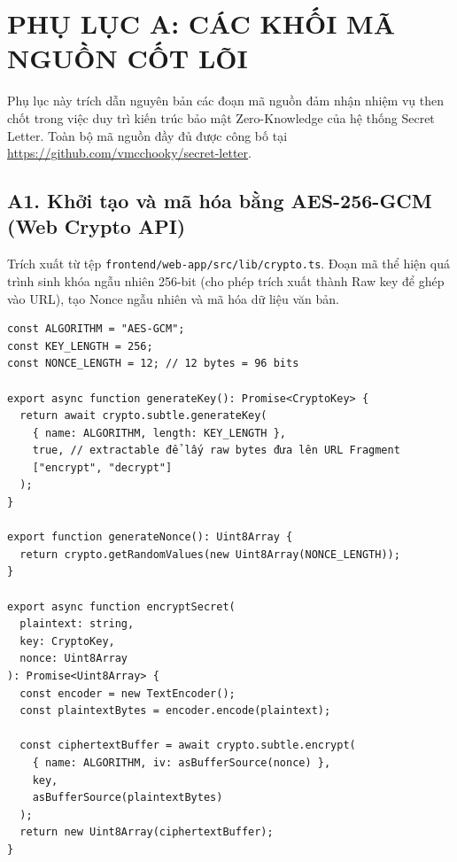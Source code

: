 \chapter*{PHỤ LỤC A: CÁC KHỐI MÃ NGUỒN CỐT LÕI}
\setcounter{section}{0}
\renewcommand{\thesection}{A\arabic{section}}

Phụ lục này trích dẫn nguyên bản các đoạn mã nguồn đảm nhận nhiệm vụ then chốt trong việc duy trì kiến trúc bảo mật Zero-Knowledge của hệ thống Secret Letter. Toàn bộ mã nguồn đầy đủ được công bố tại \url{https://github.com/vmcchooky/secret-letter}.

\section*{A1. Khởi tạo và mã hóa bằng AES-256-GCM (Web Crypto API)}

Trích xuất từ tệp \texttt{frontend/web-app/src/lib/crypto.ts}. Đoạn mã thể hiện quá trình sinh khóa ngẫu nhiên 256-bit (cho phép trích xuất thành Raw key để ghép vào URL), tạo Nonce ngẫu nhiên và mã hóa dữ liệu văn bản.

\begin{verbatim}
const ALGORITHM = "AES-GCM";
const KEY_LENGTH = 256;
const NONCE_LENGTH = 12; // 12 bytes = 96 bits

export async function generateKey(): Promise<CryptoKey> {
  return await crypto.subtle.generateKey(
    { name: ALGORITHM, length: KEY_LENGTH },
    true, // extractable để lấy raw bytes đưa lên URL Fragment
    ["encrypt", "decrypt"]
  );
}

export function generateNonce(): Uint8Array {
  return crypto.getRandomValues(new Uint8Array(NONCE_LENGTH));
}

export async function encryptSecret(
  plaintext: string,
  key: CryptoKey,
  nonce: Uint8Array
): Promise<Uint8Array> {
  const encoder = new TextEncoder();
  const plaintextBytes = encoder.encode(plaintext);

  const ciphertextBuffer = await crypto.subtle.encrypt(
    { name: ALGORITHM, iv: asBufferSource(nonce) },
    key,
    asBufferSource(plaintextBytes)
  );
  return new Uint8Array(ciphertextBuffer);
}
\end{verbatim}

